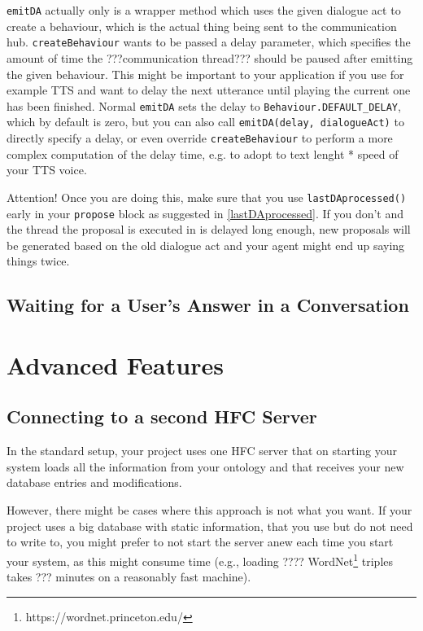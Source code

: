 \texttt{emitDA} actually only is a wrapper method which uses the given dialogue act to create a behaviour, which is the actual thing being sent to the communication hub. \texttt{createBehaviour} wants to be passed a delay parameter, which specifies the amount of time the ???communication thread??? 
should be paused after emitting the given behaviour. This might be important to your application if you use for example TTS and want to delay the next utterance until playing the current one has been finished.
Normal \texttt{emitDA} sets the delay to \texttt{Behaviour.DEFAULT\_DELAY}, which by default is zero, but you can also call \texttt{emitDA(delay, dialogueAct)} to directly specify a delay, or even override \texttt{createBehaviour} to perform a more complex computation of the delay time, e.g. to adopt to text lenght * speed of your TTS voice.

Attention! Once you are doing this, make sure that you use \texttt{lastDAprocessed()} early in your \texttt{propose} block as suggested in \ref{lastDAprocessed}. If you don't and the thread the proposal is executed in is delayed long enough, new proposals will be generated based on the old dialogue act and your agent might end up saying things twice.

\subsection{Waiting for a User's Answer in a Conversation}


\section{Advanced Features}

\subsection{Connecting to a second HFC Server} \label{sec:2ndHfc}
In the standard setup, your \vonda project uses one HFC server that on starting your system loads all the information from your ontology and that receives your new database entries and modifications.

However, there might be cases where this approach is not what you want. If your project uses a big database with static information, that you use but do not need to write to, you might prefer to not start the server anew each time you start your system, as this might consume time (e.g., loading ???? WordNet\footnote{https://wordnet.princeton.edu/} triples takes ??? minutes on a reasonably fast machine).


